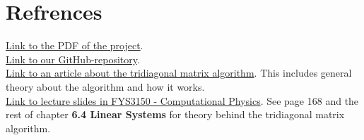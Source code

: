 \documentclass{article}
\begin{document}
\clearpage

\vspace{1cm}

\section{Refrences}

\href{https://github.com/CompPhysics/ComputationalPhysics/blob/master/doc/Projects/2019/Project1/pdf/Project1.pdf}{Link to the PDF of the project}. \\

\href{https://github.com/Erikbgram/Fys3150}{Link to our GitHub-repository}. \\

\href{http://www.industrial-maths.com/ms6021_thomas.pdf}{Link to an article about the tridiagonal matrix algorithm}. This includes general theory about the algorithm and how it works. \\

\href{https://github.com/CompPhysics/ComputationalPhysics/blob/master/doc/Lectures/lectures2015.pdf}{Link to lecture slides in FYS3150 - Computational Physics}. See page 168 and the rest of chapter \textbf{6.4 Linear Systems} for theory behind the tridiagonal matrix algorithm.






\end{document}
